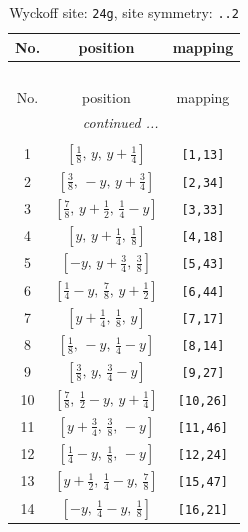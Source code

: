 \documentclass[fleqn,8pt]{jsarticle}
\begin{document}
\begin{longtable}{ccc}
\caption{Wyckoff site: {\tt 24g}, site symmetry: {\tt ..2}}
 \\
 \hline \hline
No. & position & mapping \\ \hline \endfirsthead

\multicolumn{2}{l}{\tablename\ \thetable{}} \\
 \hline \hline
No. & position & mapping \\ \hline \endhead

 \hline \hline
\multicolumn{2}{r}{\footnotesize\it continued ...} \\ \endfoot

 \hline \hline
\multicolumn{2}{r}{} \\ \endlastfoot

1 & $\left[ \frac{1}{8},\, y,\, y + \frac{1}{4} \right]$ & {\tt [1,13]} \\ \hline
2 & $\left[ \frac{3}{8},\, - y,\, y + \frac{3}{4} \right]$ & {\tt [2,34]} \\ \hline
3 & $\left[ \frac{7}{8},\, y + \frac{1}{2},\, \frac{1}{4} - y \right]$ & {\tt [3,33]} \\ \hline
4 & $\left[ y,\, y + \frac{1}{4},\, \frac{1}{8} \right]$ & {\tt [4,18]} \\ \hline
5 & $\left[ - y,\, y + \frac{3}{4},\, \frac{3}{8} \right]$ & {\tt [5,43]} \\ \hline
6 & $\left[ \frac{1}{4} - y,\, \frac{7}{8},\, y + \frac{1}{2} \right]$ & {\tt [6,44]} \\ \hline
7 & $\left[ y + \frac{1}{4},\, \frac{1}{8},\, y \right]$ & {\tt [7,17]} \\ \hline
8 & $\left[ \frac{1}{8},\, - y,\, \frac{1}{4} - y \right]$ & {\tt [8,14]} \\ \hline
9 & $\left[ \frac{3}{8},\, y,\, \frac{3}{4} - y \right]$ & {\tt [9,27]} \\ \hline
10 & $\left[ \frac{7}{8},\, \frac{1}{2} - y,\, y + \frac{1}{4} \right]$ & {\tt [10,26]} \\ \hline
11 & $\left[ y + \frac{3}{4},\, \frac{3}{8},\, - y \right]$ & {\tt [11,46]} \\ \hline
12 & $\left[ \frac{1}{4} - y,\, \frac{1}{8},\, - y \right]$ & {\tt [12,24]} \\ \hline
13 & $\left[ y + \frac{1}{2},\, \frac{1}{4} - y,\, \frac{7}{8} \right]$ & {\tt [15,47]} \\ \hline
14 & $\left[ - y,\, \frac{1}{4} - y,\, \frac{1}{8} \right]$ & {\tt [16,21]} \\ \hline

\end{longtable}
\end{document}
